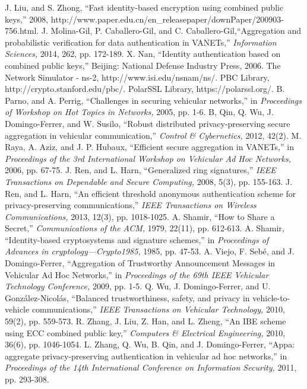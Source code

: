 \documentclass[a4paper]{article}
\begin{document}
\begin{thebibliography}{40}
 J. Liu, and S. Zhong, ``Fast identity-based encryption using combined public keys,'' 2008, http://www.paper.edu.cn/en\_releasepaper/downPaper/200903-756.html.
 J. Molina-Gil, P. Caballero-Gil, and C. Caballero-Gil,``Aggregation and probabilistic verification for data authentication in VANETs,'' \emph{Information Sciences,} 2014, 262, pp. 172-189.
 X. Nan, ``Identity authentication based on combined public keys,'' Beijing: National Defense Industry Press, 2006.
 The Network Simulator - ns-2, http://www.isi.edu/nsnam/ns/.
 PBC Library, http://crypto.stanford.edu/pbc/.
 PolarSSL Library, https://polarssl.org/.
 B. Parno, and A. Perrig, ``Challenges in securing vehicular networks,'' in \emph{Proceedings of Workshop on Hot Topics in Networks,} 2005, pp. 1-6.
 B, Qin, Q. Wu, J. Domingo-Ferrer, and W. Susilo, ``Robust distributed privacy-preserving secure aggregation in vehicular communication,'' \emph{Control \& Cybernetics,} 2012, 42(2).
 M. Raya, A. Aziz, and J. P. Hubaux, ``Efficient secure aggregation in VANETs,'' in \emph{Proceedings of the 3rd International Workshop on Vehicular Ad Hoc Networks,} 2006, pp. 67-75.
 J. Ren, and L. Harn, ``Generalized ring signatures,'' \emph{IEEE Transactions on Dependable and Secure Computing,} 2008, 5(3), pp. 155-163.
 J. Ren, and L. Harn, ``An efficient threshold anonymous authentication scheme for privacy-preserving communications,'' \emph{IEEE Transactions on Wireless Communications,} 2013, 12(3), pp. 1018-1025.
 A. Shamir, ``How to Share a Secret,'' \emph{Communications of the ACM,} 1979, 22(11), pp. 612-613.
 A. Shamir, ``Identity-based cryptosystems and signature schemes,'' in \emph{Proceedings of Advances in cryptology---Crypto1985,} 1985, pp. 47-53.
 A. Viejo, F. Seb\'{e}, and J. Domingo-Ferrer, ``Aggregation of Trustworthy Announcement Messages in Vehicular Ad Hoc Networks,'' in \emph{Proceedings of the 69th IEEE Vehicular Technology Conference,} 2009, pp. 1-5.
 Q. Wu, J. Domingo-Ferrer, and U. Gonz\'{a}lez-Nicol\'{a}s, ``Balanced trustworthiness, safety, and privacy in vehicle-to-vehicle communications,'' \emph{IEEE Transactions on Vehicular Technology,} 2010, 59(2), pp. 559-573.
 R. Zhang, J. Liu, Z. Han, and L. Zheng, ``An IBE scheme using ECC combined public key,'' \emph{Computers \& Electrical Engineering,} 2010, 36(6), pp. 1046-1054.
 L. Zhang, Q. Wu, B. Qin, and J. Domingo-Ferrer, ``Appa: aggregate privacy-preserving authentication in vehicular ad hoc networks,'' in \emph{Proceedings of the 14th International Conference on Information Security,} 2011, pp. 293-308.


\end{thebibliography}
\end{document}
